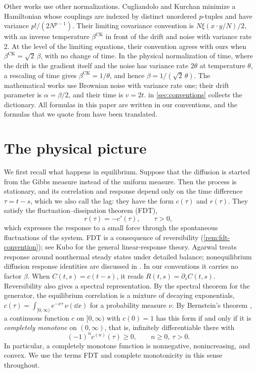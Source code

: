 Other works use other normalizations. Cugliandolo and Kurchan \cite[Equations~(1)--(2)]{ck1993} minimize a Hamiltonian whose couplings are indexed by distinct unordered $p$-tuples and have variance $p!/(2N^{p-1})$. Their limiting covariance convention is $N\xi(x\cdot y/N)/2$, with an inverse temperature $\beta^{\mathrm{CK}}$ in front of the drift and noise with variance rate $2$. At the level of the limiting equations, their convention agrees with ours when $\beta^{\mathrm{CK}}=\sqrt2\,\beta$, with no change of time. In the physical normalization of time, where the drift is the gradient itself and the noise has variance rate $2\theta$ at temperature $\theta$, a rescaling of time gives $\beta^{\mathrm{CK}}=1/\theta$, and hence $\beta=1/(\sqrt2\,\theta)$. The mathematical works \cite{bag2006,dgm2007,sellke2024} use Brownian noise with variance rate one; their drift parameter is $\alpha=\beta/2$, and their time is $v=2t$.  in \cref{sec:conventions} collects the dictionary. All formulas in this paper are written in our conventions, and the formulas that we quote from \cite{ck1993,cs1995,dgm2007,sellke2024} have been translated.

\section{The physical picture}\label{sec:intro-picture}

We first recall what happens in equilibrium. Suppose that the diffusion is started from the Gibbs measure instead of the uniform measure. Then the process is stationary, and its correlation and response depend only on the time difference $\tau=t-s$, which we also call the lag: they have the form $c(\tau)$ and $r(\tau)$. They satisfy the fluctuation--dissipation theorem (FDT),
\[
 r(\tau)=-c'(\tau),\qquad \tau>0,
\]
which expresses the response to a small force through the spontaneous fluctuations of the system. FDT is a consequence of reversibility (\cref{rem:fdt-convention}); see Kubo \cite{kubo1957} for the general linear-response theory. Agarwal \cite{agarwal1972} treats response around nonthermal steady states under detailed balance; nonequilibrium diffusion response identities are discussed in \cite{bmw2009}. In our conventions it carries no factor $\beta$. When $C(t,s)=c(t-s)$, it reads $R(t,s)=\partial_sC(t,s)$. Reversibility also gives a spectral representation. By the spectral theorem for the generator, the equilibrium correlation is a mixture of decaying exponentials, $c(\tau)=\int_{[0,\infty)}e^{-x\tau}\,\nu(\dd x)$ for a probability measure $\nu$. By Bernstein's theorem \cite{widder1941}, a continuous function $c$ on $[0,\infty)$ with $c(0)=1$ has this form if and only if it is \emph{completely monotone} on $(0,\infty)$, that is, infinitely differentiable there with
\[
 (-1)^nc^{(n)}(\tau)\ge0,\qquad n\ge0,\ \tau>0.
\]
In particular, a completely monotone function is nonnegative, nonincreasing, and convex. We use the terms FDT and complete monotonicity in this sense throughout.

